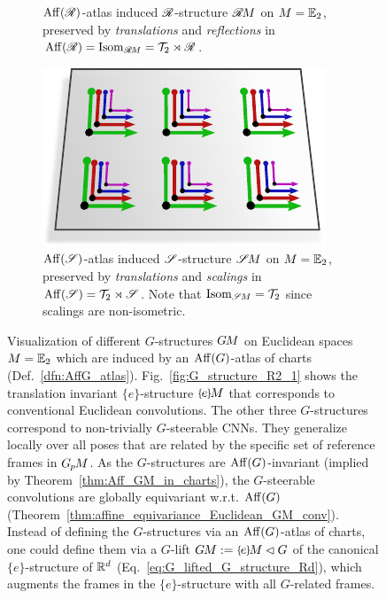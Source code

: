 \begin{figure}
\begin{subfigure}[b]{0.46\textwidth}
        \captionsetup{format=hang}
        \caption{\small
            $\operatorname{Aff}(\mathscr{R})$-atlas induced $\mathscr{R}$-structure $\mathscr{R}\mkern-1.8muM$ on $M=\mathbb{E}_2$, preserved by \emph{translations} and \emph{reflections} in $\operatorname{Aff}(\mathscr{R}) = \operatorname{Isom}_{\mathscr{R}\mkern-1.8muM} = \mathcal{T}_2 \rtimes \mathscr{R}$.
            \\
        }
        \label{fig:G_structure_R2_3}
    \end{subfigure}
    \hfill
    \begin{subfigure}[b]{0.46\textwidth}
        \centering
        \includegraphics[width=.7\textwidth]{figures/G_structure_R2_4.pdf}
        \captionsetup{format=hang}
        \caption{\small
            $\operatorname{Aff}(\mathscr{S})$-atlas induced $\mathscr{S}$-structure $\mathscr{S}\mkern-1.8muM$ on $M=\mathbb{E}_2$, preserved by \emph{translations} and \emph{scalings} in $\operatorname{Aff}(\mathscr{S}) = \mathcal{T}_2 \rtimes \mathscr{S}$.
            Note that $\operatorname{Isom}_{\mathscr{S}\mkern-1.8muM} = \mathcal{T}_2$ since scalings are non-isometric.
        }
        \label{fig:G_structure_R2_4}
    \end{subfigure}
    \vspace*{0ex}
    \caption{\small
        Visualization of different $G$-structures $G\mkern-1.4muM$ on Euclidean spaces $M=\mathbb{E}_2$ which are induced by an $\operatorname{Aff}(G)$-atlas of charts (Def.~\ref{dfn:AffG_atlas}).
        Fig.~\ref{fig:G_structure_R2_1} shows the translation invariant $\{e\}$-structure $\eM$ that corresponds to conventional Euclidean convolutions.
        The other three $G$-structures correspond to non-trivially $G$-steerable CNNs.
        They generalize locally over all poses that are related by the specific set of reference frames in $G_{\mkern-1.3mu p}\mkern-1.2muM$.
        As the $G$-structures are $\operatorname{Aff}(G)$-invariant (implied by Theorem~\ref{thm:Aff_GM_in_charts}), the $G$-steerable convolutions are globally equivariant w.r.t. $\operatorname{Aff}(G)$ (Theorem~\ref{thm:affine_equivariance_Euclidean_GM_conv}).
        Instead of defining the $G$-structures via an $\operatorname{Aff}(G)$-atlas of charts, one could define them via a $G$-lift $\GM := \eM \lhd G$ of the canonical $\{e\}$-structure of $\mathbb{R}^d$ (Eq.~\eqref{eq:G_lifted_G_structure_Rd}), which augments the frames in the $\{e\}$-structure with all $G$-related frames.
     }
    \label{fig:G_structures_R2_main}
\end{figure} 


